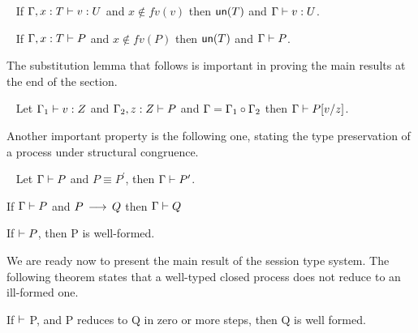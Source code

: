 \begin{lemma}~\label{lmm:strengtheningexpressions}
 If $\Gamma, x: T \mathrel{\vdash} v: U$ and $x\notin fv(v)$ then $\mathsf{un}(T)$ and $\Gamma \mathrel{\vdash} v: U$.
\end{lemma}

\begin{lemma}[Strengthening]~\label{lmm:strengthening}
 If $\Gamma, x: T \mathrel{\vdash} P$ and $x\notin fv(P)$ then $\mathsf{un}(T)$ and $\Gamma \mathrel{\vdash} P$.
\end{lemma}

The substitution lemma that follows is important in proving the main results at the end of the section.

\begin{lemma}[Substitution]~\label{lmm:substitution}
Let $\Gamma_1 \mathrel{\vdash} v: Z$ and $\Gamma_2, z: Z \mathrel{\vdash} P$  and $\Gamma = \Gamma_1 \circ \Gamma_2$ then $\Gamma \mathrel{\vdash} P[{v}/{z}]$.
\end{lemma}

Another important property is the following one, stating the type preservation of a process under structural congruence.

\begin{lemma}
~\label{lmm:type-preservation-equiv}
Let $\Gamma \mathrel{\vdash} P$ and $P \equiv P^\prime$, then $\Gamma \mathrel{\vdash} P^\prime$.
\end{lemma}


\begin{theorem}\label{thm:type-preservation}
  If $\Gamma \mathrel{\vdash} P$ and $P \,\longrightarrow\, Q$ then $\Gamma \mathrel{\vdash} Q$
\end{theorem}


\begin{theorem}[Progress]
If $\mathrel{\vdash} P$, then P is well-formed.
\end{theorem}
\vspace{-2mm}
%
We are ready now to present the main result of the session type system. The following theorem states that a well-typed closed process does not reduce to an ill-formed one.

\begin{theorem}
If $\mathrel{\vdash}$ P, and P reduces to Q in zero or more steps, then Q is well formed.
\end{theorem}
\vspace{-2mm}
